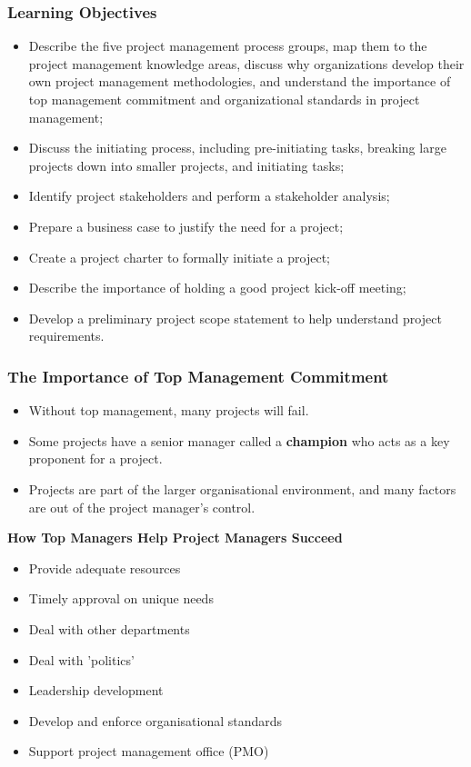 \documentclass[aspectratio=169]{beamer}
\begin{document}
\begin{frame}
\frametitle{Learning Objectives}
\begin{itemize}
\item Describe the five project management process groups, map them to the project management knowledge areas, discuss why organizations develop their own project management methodologies, and understand the importance of top management commitment and organizational standards in project management;
\item Discuss the initiating process, including pre-initiating tasks, breaking large projects down into smaller projects, and initiating tasks;
\item Identify project stakeholders and perform a stakeholder analysis;
\item Prepare a business case to justify the need for a project;
\item Create a project charter to formally initiate a project;
\item Describe the importance of holding a good project kick-off meeting;
\item Develop a preliminary project scope statement to help understand project requirements.
\end{itemize}

\end{frame}

\begin{frame}
\frametitle{The Importance of Top Management Commitment}
\vspace{-0.1cm}
\begin{itemize}
\item Without top management, many projects will fail.
\item Some projects have a senior manager called a \textbf{champion} who acts as a key proponent for a project.
\item Projects are part of the larger organisational environment, and many factors are out of the project manager's control.
\end{itemize}

\begin{tcolorbox}
\textbf{How Top Managers Help Project Managers Succeed}
\footnotesize
\begin{itemize}
\item Provide adequate resources
\item Timely approval on unique needs
\item Deal with other departments
\item Deal with 'politics'
\item Leadership development
\item Develop and enforce organisational standards
\item Support project management office (PMO)
\end{itemize}
\end{tcolorbox}
\end{frame}
\end{document}
